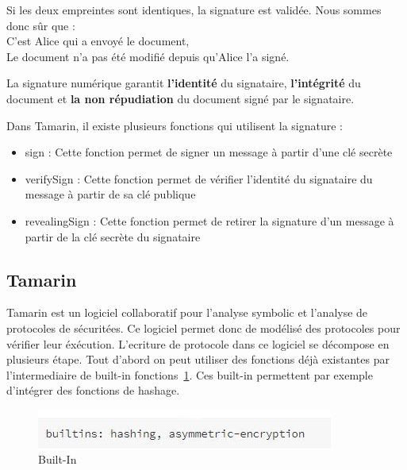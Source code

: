 \documentclass[conference]{IEEEtran}
\begin{document}
    Si les deux empreintes sont identiques, la signature est validée. Nous sommes donc sûr que : \\
        C'est Alice qui a envoyé le document, \\
        Le document n'a pas été modifié depuis qu'Alice l'a signé.
\cite{igmsign}

La signature numérique garantit \textbf{l'identité} du signataire, \textbf{l'intégrité} du document et \textbf{la non répudiation} du document signé par le signataire.

Dans Tamarin, il existe plusieurs fonctions qui utilisent la signature :
\begin{itemize}
    \item sign : Cette fonction permet de signer un message à partir d'une clé secrète
    \item verifySign : Cette fonction permet de vérifier l'identité du signataire du message à partir de sa clé publique
    \item revealingSign : Cette fonction permet de retirer la signature d'un message à partir de la clé secrète du signataire
\end{itemize}
\subsection{Tamarin}

Tamarin est un logiciel collaboratif pour l'analyse symbolic et l'analyse de protocoles de sécuritées. Ce logiciel permet donc de modélisé des protocoles pour vérifier leur éxécution. L'ecriture de protocole dans ce logiciel se décompose en plusieurs étape. Tout d'abord on peut utiliser des fonctions déjà existantes par l'intermediaire de built-in fonctions~\ref{B-I}. Ces built-in permettent par exemple d'intégrer des fonctions de hashage. \\

\begin{center}
\begin{figure}[!h]
\centering
\includegraphics[scale=0.6]{BuiltIn.JPG}
\caption{Built-In}
\label{B-I}
\end{figure}
\end{center}
\end{document}
